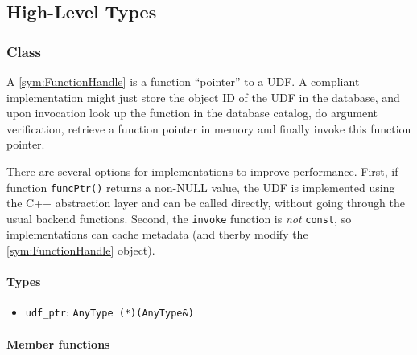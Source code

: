\subsection{High-Level Types}

\subsubsection[Class FunctionHandle]{Class }

A \ref{sym:FunctionHandle} is a function ``pointer'' to a UDF. A compliant implementation might just store the object ID of the UDF in the database, and upon invocation look up the function in the database catalog, do argument verification, retrieve a function pointer in memory and finally invoke this function pointer.

There are several options for implementations to improve performance. First, if function \texttt{funcPtr()} returns a non-NULL value, the UDF is implemented using the C++ abstraction layer and can be called directly, without going through the usual backend functions. Second, the \texttt{invoke} function is \emph{not} \texttt{const}, so implementations can cache metadata (and therby modify the \ref{sym:FunctionHandle} object).

\paragraph{Types}

\begin{itemize}
	\item
		\texttt{udf\_ptr}: \texttt{AnyType (*)(AnyType\&)}
\end{itemize}

\paragraph{Member functions}

